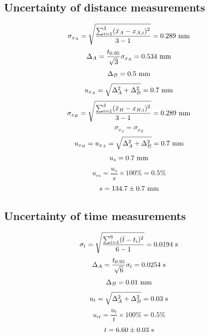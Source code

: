 \documentclass[a4paper]{report}
\begin{document}
	\subsection{Uncertainty of distance measurements}
	\begin{equation*}
	\sigma_{x_A}=\sqrt{\dfrac{\sum_{i=1}^3(\bar{x}_A-x_{A,i})^2}{3-1}}=0.289\ \rm{mm}
	\end{equation*}
	\begin{equation*}
	\Delta_A=\dfrac{t_{0.95}}{\sqrt{3}}\sigma_{x_A}=0.534\ \rm{mm}
	\end{equation*}
	\begin{equation*}
	\Delta_B=0.5\ \rm{mm}
	\end{equation*}
	\begin{equation*}
	u_{x_A}=\sqrt{\Delta_A^2+\Delta_B^2}=0.7\ \rm{mm}
	\end{equation*}
	\begin{equation*}
	\sigma_{x_B}=\sqrt{\dfrac{\sum_{i=1}^3(\bar{x}_B-x_{B,i})^2}{3-1}}=0.289\ \rm{mm}
	\end{equation*}
	\begin{equation*}
	\sigma_{x_A}=\sigma_{x_B}
	\end{equation*}
	\begin{equation*}
	u_{x_B}=u_{x_A}=\sqrt{\Delta_A^2+\Delta_B^2}=0.7\ \rm{mm}
	\end{equation*}
	\begin{equation*}
	u_s=0.7\ \rm{mm}
	\end{equation*}
	\begin{equation*}
	u_{rs}=\dfrac{u_s}{s}\times100\%=0.5\%
	\end{equation*}
	\begin{equation*}
	s=134.7\pm0.7\ \rm{mm}
	\end{equation*}
	\subsection{Uncertainty of time measurements}
	\begin{equation*}
	\sigma_t=\sqrt{\dfrac{\sum_{i=1}^6(\bar{t}-t_i)^2}{6-1}}=0.0194\ \rm{s}
	\end{equation*}
	\begin{equation*}
	\Delta_A=\dfrac{t_{0.95}}{\sqrt{6}}\sigma_t=0.0254\ \rm{s}
	\end{equation*}
	\begin{equation*}
	\Delta_B=0.01\ \rm{mm}
	\end{equation*}
	\begin{equation*}
	u_t=\sqrt{\Delta_A^2+\Delta_B^2}=0.03\ \rm{s}
	\end{equation*}
	\begin{equation*}
	u_{rt}=\dfrac{u_t}{t}\times100\%=0.5\%
	\end{equation*}
	\begin{equation*}
	t=6.60\pm0.03\ \rm{s}
	\end{equation*}
\end{document}
